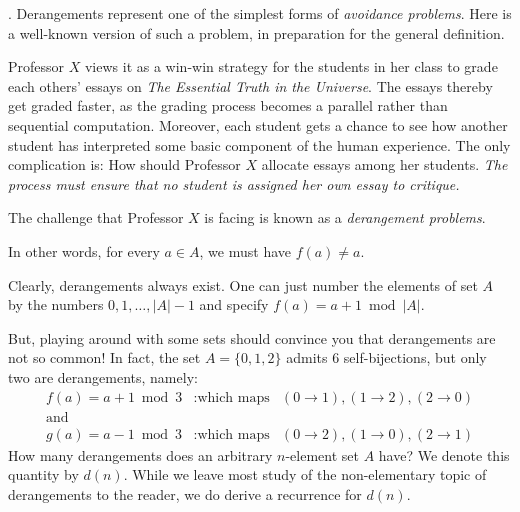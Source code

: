 \bigskip


.
Derangements represent one of the simplest forms of {\em avoidance problems}.  Here is a
well-known version of such a problem, in preparation for the general definition.

Professor $X$ views it as a win-win strategy for the students in her class to grade each
others' essays on {\it The Essential Truth in the Universe}.  The essays thereby get graded faster,
as the grading process becomes a parallel rather than sequential computation.  Moreover,
each student gets a chance to see how another student has interpreted some basic
component of the human experience.  The only complication is: How should Professor $X$ 
allocate essays among her students.  {\em The process must ensure that no student is assigned her
own essay to critique.}

The challenge that Professor $X$ is facing is known as a {\em derangement problems}.

\medskip

  In other words, for every $a \in A$, we must have $f(a) \neq a$.

\medskip

Clearly, derangements always exist.  One can just number the elements of set $A$ by the numbers
$0, 1, \ldots, |A|-1$ and specify $f(a) = a+1 \bmod |A|$.

But, playing around with some sets should convince you that derangements are not so common!
In fact, the set  $A = \{0, 1,2 \}$ admits $6$ self-bijections, but only two are derangements, namely:
\[
\begin{array}{lll}
f(a) = a+1 \bmod 3 &: \mbox{which maps} &(0 \rightarrow 1),  (1 \rightarrow 2), (2 \rightarrow 0) \\
\mbox{and} &  & \\
g(a) = a-1 \bmod 3 &: \mbox{which maps} & (0 \rightarrow 2),  (1 \rightarrow 0), (2 \rightarrow 1)
\end{array}
\]
How many derangements does an arbitrary $n$-element set $A$ have?   We denote this quantity
by $d(n)$.  While we leave most study of the non-elementary topic of derangements to the reader,
we do derive a recurrence for $d(n)$. 

\medskip

